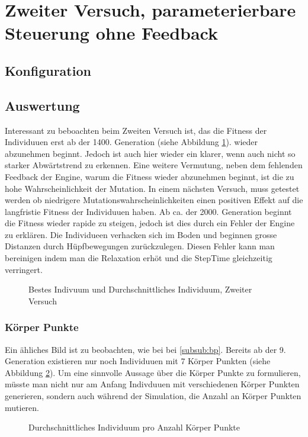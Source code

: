   \section{Zweiter Versuch, parameterierbare Steuerung ohne Feedback}

    \subsection{Konfiguration}
        

    \subsection{Auswertung}
      Interessant zu beboachten beim Zweiten Versuch ist, das die Fitness der Individuuen erst ab der 1400. Generation (siehe Abbildung \ref{fig:graphSecond}).
      wieder abzunehmen beginnt. Jedoch ist auch hier wieder ein klarer, wenn auch nicht so starker Abwärtstrend zu erkennen.
      Eine weitere Vermutung, neben dem fehlenden Feedback der Engine, warum die Fitness wieder abzunehmen beginnt,
      ist die zu hohe Wahrscheinlichkeit der Mutation. In einem nächsten Versuch, muss getestet werden ob niedrigere Mutationswahrscheinlichkeiten
      einen positiven Effekt auf die langfristie Fitness der Individuuen haben. Ab ca. der 2000. Generation beginnt die Fitness wieder rapide zu steigen,
      jedoch ist dies durch ein Fehler der Engine zu erklären. Die Individueen verhacken sich im Boden und beginnen grosse Distanzen durch Hüpfbewegungen zurückzulegen.
      Diesen Fehler kann man bereinigen indem man die Relaxation erhöt und die StepTime gleichzeitig verringert.
        \begin{figure}
          
          \caption{Bestes Indivuum und Durchschnittliches Individuum, Zweiter Versuch}
          \label{fig:graphSecond}
        \end{figure}

    \subsubsection{Körper Punkte}
      Ein ähliches Bild ist zu beobachten, wie bei bei \ref{subsub:bp}.
      Bereits ab der 9. Generation existieren nur noch Individuuen mit 7 Körper Punkten (siehe Abbildung \ref{fig:graphBpSecond}).
      Um eine sinnvolle Aussage über die Körper Punkte zu formulieren, müsste man nicht nur am Anfang Indivduuen mit verschiedenen Körper Punkten generieren,
      sondern auch während der Simulation, die Anzahl an Körper Punkten mutieren.
    \begin{figure}
      
      \caption{Durchschnittliches Individuum pro Anzahl Körper Punkte}
      \label{fig:graphBpSecond}
    \end{figure}
